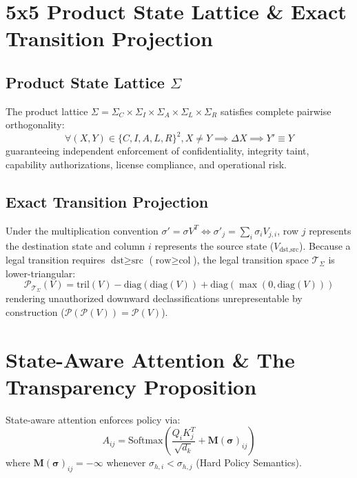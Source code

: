 \documentclass[10pt,twocolumn,letterpaper]{article}
\begin{document}
\section{5x5 Product State Lattice \& Exact Transition Projection}

\subsection{Product State Lattice $\Sigma$}
The product lattice $\Sigma = \Sigma_C \times \Sigma_I \times \Sigma_A \times \Sigma_L \times \Sigma_R$ satisfies complete pairwise orthogonality:
\begin{equation}
\forall (X, Y) \in \{C, I, A, L, R\}^2, X \neq Y \implies \Delta X \implies Y' \equiv Y
\end{equation}
guaranteeing independent enforcement of confidentiality, integrity taint, capability authorizations, license compliance, and operational risk.

\subsection{Exact Transition Projection}
Under the multiplication convention $\sigma' = \sigma V^T \iff \sigma'_j = \sum_i \sigma_i V_{j, i}$, row $j$ represents the destination state and column $i$ represents the source state ($V_{\text{dst}, \text{src}}$). Because a legal transition requires $\text{dst} \ge \text{src}$ ($\text{row} \ge \text{col}$), the legal transition space $\mathcal{T}_\Sigma$ is lower-triangular:
\begin{equation}
\mathcal{P}_{\mathcal{T}_\Sigma}(V) = \text{tril}(V) - \text{diag}(\text{diag}(V)) + \text{diag}(\max(0, \text{diag}(V)))
\end{equation}
rendering unauthorized downward declassifications unrepresentable by construction ($\mathcal{P}(\mathcal{P}(V)) = \mathcal{P}(V)$).

\section{State-Aware Attention \& The Transparency Proposition}

State-aware attention enforces policy via:
\begin{equation}
A_{ij} = \text{Softmax}\left( \frac{Q_i K_j^T}{\sqrt{d_k}} + \mathbf{M}(\boldsymbol{\sigma})_{ij} \right)
\end{equation}
where $\mathbf{M}(\boldsymbol{\sigma})_{ij} = -\infty$ whenever $\sigma_{h,i} < \sigma_{h,j}$ (Hard Policy Semantics).
\end{document}
